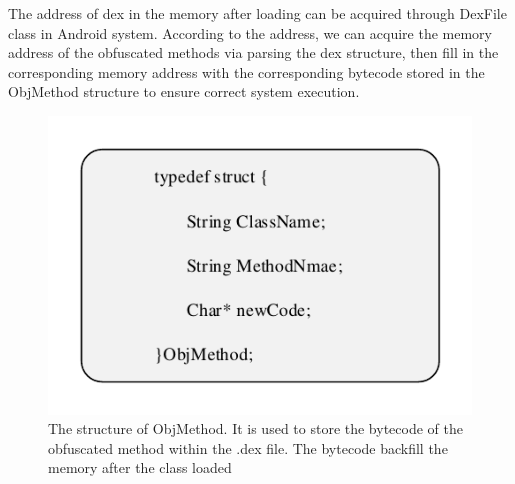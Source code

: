 \begin{enumerate}[leftmargin=*]
    The address of dex in the memory after loading can be acquired through DexFile class in Android system. According to the address, we can acquire the memory address of the obfuscated methods via parsing the dex structure, then fill in the corresponding memory address with the corresponding  bytecode stored in the ObjMethod structure to ensure correct system execution.
\end{enumerate}

\begin{figure}[!tbp]
  \centering
  \includegraphics[width=0.8\columnwidth]{fig/fig6.pdf}
  \caption{The structure of ObjMethod. It is used to store the bytecode of the obfuscated method within the .dex file. The bytecode backfill the memory after the class loaded}\label{fig:Figure 6}
\end{figure}